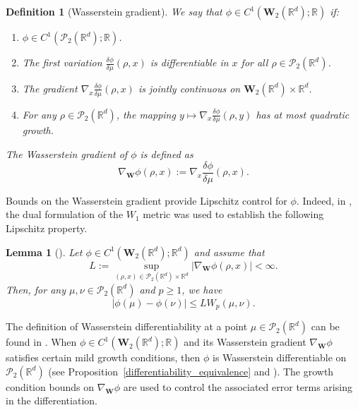 \documentclass[11pt,a4paper]{amsart}
\newcommand{\1}{\mathds{1}}
\newcommand{\R}{{\mathbb R}}
\newtheorem{lemma}[theorem]{\textbf{Lemma}}
\newtheorem{definition}[theorem]{\textbf{Definition}}
\numberwithin{equation}{section}
\begin{document}
    \begin{definition}[Wasserstein gradient]  \label{Wasserstein_Grad_Def}
We say that $\phi \in C^1(\mathbf{W}_2(\mathbb{R}^d); \mathbb{R})$ if:
\begin{enumerate}
    \item $\phi \in C^1(\mathcal{P}_2(\mathbb{R}^d); \mathbb{R})$.
    \item The first variation $\frac{\delta \phi}{\delta \mu}(\rho, x)$ is differentiable in $x$ for all $\rho \in \mathcal{P}_2(\mathbb{R}^d)$.
    \item The gradient $\nabla_x \frac{\delta \phi}{\delta \mu}(\rho, x)$ is jointly continuous on $\mathbf{W}_2(\mathbb{R}^d) \times \mathbb{R}^d$.
    \item For any $\rho \in \mathcal{P}_2(\R^d)$, the mapping $y \mapsto \nabla_x \frac{\delta \phi}{\delta \mu}(\rho, y)$ has at most quadratic growth.
\end{enumerate}

\noindent The \textit{Wasserstein gradient} of $\phi$ is defined as
\[
\nabla_{\mathbf{W}} \phi(\rho, x) := \nabla_x \frac{\delta \phi}{\delta \mu}(\rho, x).
\]
\end{definition}



Bounds on the Wasserstein gradient provide Lipschitz control for $\phi$. Indeed, in \cite[Section 2]{cardaliaguet2019master}, the dual formulation of the $W_1$ metric was used to establish the following Lipschitz property.

\smallskip

\begin{lemma}[\cite{cardaliaguet2019master}] \label{Lipschitz}
Let $\phi \in C^1(\mathbf{W}_2(\R^d);\R^d)$ and assume that
\[
L := \sup_{(\rho,x) \in \mathcal{P}_2(\R^d) \times \R^d} |\nabla_{\mathbf{W}} \phi(\rho,x)| < \infty.
\]
\noindent Then, for any $\mu, \nu \in \mathcal{P}_2(\R^d)$ and $p \geq 1$, we have
\begin{equation}
    |\phi(\mu) - \phi(\nu)| \leq L W_p(\mu,\nu).
    \label{lipschitz_w1}
\end{equation}
\end{lemma}

The definition of Wasserstein differentiability at a point $\mu \in \mathcal{P}_2(\mathbb{R}^d)$ can be found in \cite[Definition 3.11]{gangbo2019differentiability}. When $\phi \in C^1(\mathbf{W}_2(\mathbb{R}^d); \mathbb{R})$ and its Wasserstein gradient $\nabla_{\mathbf{W}} \phi$ satisfies certain mild growth conditions, then $\phi$ is Wasserstein differentiable on $\mathcal{P}_2(\mathbb{R}^d)$ (see Proposition~\ref{differentiability_equivalence} and \cite[Corollary 3.22]{gangbo2019differentiability}). The growth condition bounds on $\nabla_{\mathbf{W}} \phi$ are used to control the associated error terms arising in the differentiation. \smallskip
\end{document}
